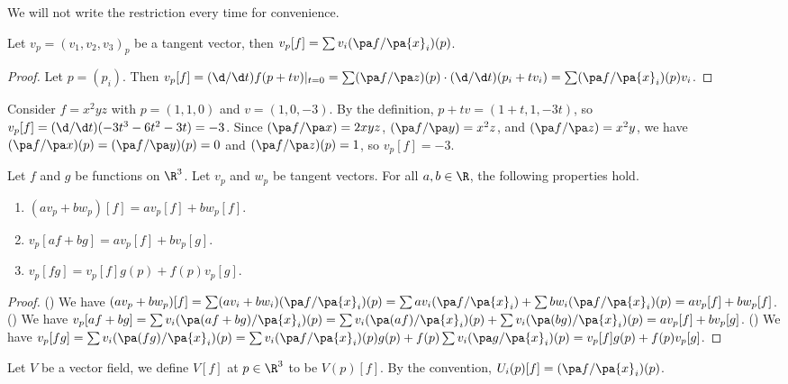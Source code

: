 \documentclass[10pt]{article}
\begin{document}
\begin{remark}
    We will not write the restriction every time for convenience.
\end{remark}
\begin{proposition}
    Let ${v}_{p}={({v}_{1},{v}_{2},{v}_{3})}_{p}$ be a tangent vector, then ${v}_{p}[f]=\sum{v}_{i}(\pa f/\pa{x}_{i})(p)$.
\end{proposition}
\begin{proof}
    Let $p=({p}_{i})$. Then ${v}_{p}[f]=(\d/\d t)f(p+tv){\vert}_{t=0}=\sum(\pa f/\pa z)(p)\cdot(\d/\d t)({p}_{i}+t{v}_{i})=\sum(\pa f/\pa{x}_{i})(p){v}_{i}$.
\end{proof}
\begin{example}
    Consider $f={x}^{2}yz$ with $p=(1,1,0)$ and $v=(1,0,-3)$. By the definition, $p+tv=(1+t,1,-3t)$, so ${v}_{p}[f]=(\d/\d t)(-3{t}^{3}-6{t}^{2}-3t)=-3$. Since $(\pa f/\pa x)=2xyz$, $(\pa f/\pa y)={x}^{2}z$, and $(\pa f/\pa z)={x}^{2}y$, we have $(\pa f/\pa x)(p)=(\pa f/\pa y)(p)=0$ and $(\pa f/\pa z)(p)=1$, so ${v}_{p}[f]=-3$.
\end{example}
\begin{proposition}
    Let $f$ and $g$ be functions on ${\R}^{3}$. Let ${v}_{p}$ and ${w}_{p}$ be tangent vectors. For all $a,b\in\R$, the following properties hold.
    \begin{enumerate}
        \item $(a{v}_{p}+b{w}_{p})[f]=a{v}_{p}[f]+b{w}_{p}[f]$.
        \item ${v}_{p}[af+bg]=a{v}_{p}[f]+b{v}_{p}[g]$.
        \item ${v}_{p}[fg]={v}_{p}[f]g(p)+f(p){v}_{p}[g]$.
    \end{enumerate}
\end{proposition}
\begin{proof}
    () We have $(a{v}_{p}+b{w}_{p})[f]=\sum(a{v}_{i}+b{w}_{i})(\pa f/\pa{x}_{i})(p)=\sum a{v}_{i}(\pa f/\pa{x}_{i})+\sum b{w}_{i}(\pa f/\pa{x}_{i})(p)=a{v}_{p}[f]+b{w}_{p}[f]$. () We have ${v}_{p}[af+bg]=\sum{v}_{i}(\pa(af+bg)/\pa{x}_{i})(p)=\sum{v}_{i}(\pa(af)/\pa{x}_{i})(p)+\sum{v}_{i}(\pa(bg)/\pa{x}_{i})(p)=a{v}_{p}[f]+b{v}_{p}[g]$. () We have ${v}_{p}[fg]=\sum{v}_{i}(\pa(fg)/\pa{x}_{i})(p)=\sum{v}_{i}(\pa f/\pa{x}_{i})(p)g(p)+f(p)\sum{v}_{i}(\pa g/\pa{x}_{i})(p)={v}_{p}[f]g(p)+f(p){v}_{p}[g]$.
\end{proof}
\par
Let $V$ be a vector field, we define $V[f]$ at $p\in{\R}^{3}$ to be $V(p)[f]$. By the convention, ${U}_{i}(p)[f]=(\pa f/\pa{x}_{i})(p)$.
\end{document}
